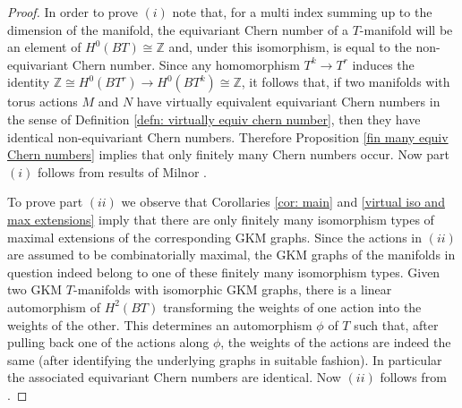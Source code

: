 \documentclass[12pt,a4paper]{amsart}
\newcommand{\ZZ}{\mathbb{Z}}
\theoremstyle{plain}
\theoremstyle{definition}
\begin{document}
\begin{proof}
In order to prove $(i)$ note that, for a multi index summing up to the dimension of the manifold, the equivariant
Chern number of a $T$-manifold will be an element of $H^0(BT)\cong \ZZ$ and, under this
isomorphism, is equal to the non-equivariant Chern number. Since any homomorphism
$T^k\rightarrow T^r$ induces the identity $\ZZ\cong H^0(BT^r)\rightarrow H^0(BT^k)\cong
\ZZ$, it follows that, if two manifolds with torus actions $M$ and $N$ have virtually
equivalent equivariant Chern numbers in the sense of Definition \ref{defn: virtually equiv
chern number}, then they have identical non-equivariant Chern numbers. Therefore Proposition
\ref{fin many equiv Chern numbers} implies that only finitely many Chern numbers occur. Now part $(i)$ follows from
results of Milnor \cite{MR119209}. 

To prove part $(ii)$ we observe that Corollaries \ref{cor: main} and \ref{virtual iso and max extensions}
imply that there are
 only finitely many isomorphism types of maximal
extensions of the corresponding GKM graphs. Since the actions in $(ii)$ are assumed to be
combinatorially maximal, the GKM graphs of the manifolds in question indeed belong to one
of these finitely many isomorphism types. Given two GKM $T$-manifolds with isomorphic GKM
graphs, there is a linear automorphism of $H^2(BT)$ transforming the weights of one action
into the weights of the other. This determines an automorphism $\phi$ of $T$ such that,
after pulling back one of the actions along $\phi$, the weights of the actions are indeed
the same (after identifying the underlying graphs in suitable fashion). In particular the
associated equivariant Chern numbers are identical. Now $(ii)$ follows from 
\cite[Theorem H.4]{MR1929136}.
\end{proof}
\end{document}
